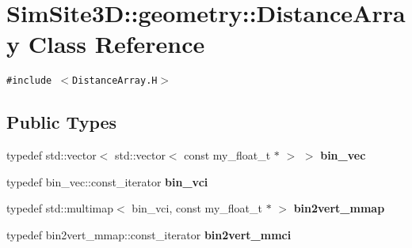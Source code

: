 \section{SimSite3D::geometry::Distance\-Array Class Reference}
\label{classSimSite3D_1_1geometry_1_1DistanceArray}
{\tt \#include $<$Distance\-Array.H$>$}

\subsection*{Public Types}
\begin{CompactItemize}
\item 
typedef std::vector$<$ std::vector$<$ const my\_\-float\_\-t $\ast$ $>$ $>$ \textbf{bin\_\-vec}\label{classSimSite3D_1_1geometry_1_1DistanceArray_c997ffd8bddac3ff42c7dbc23c39e47d}

\item 
typedef bin\_\-vec::const\_\-iterator \textbf{bin\_\-vci}\label{classSimSite3D_1_1geometry_1_1DistanceArray_4a9a352c0bef59cc6afd3288b7465c8c}

\item 
typedef std::multimap$<$ bin\_\-vci, const my\_\-float\_\-t $\ast$ $>$ \textbf{bin2vert\_\-mmap}\label{classSimSite3D_1_1geometry_1_1DistanceArray_60d957c24874b08bca3c6e3f00a09ce5}

\item 
typedef bin2vert\_\-mmap::const\_\-iterator \textbf{bin2vert\_\-mmci}\label{classSimSite3D_1_1geometry_1_1DistanceArray_ec84c66a10ac537a7e6f84c1d558224e}

\end{CompactItemize}
